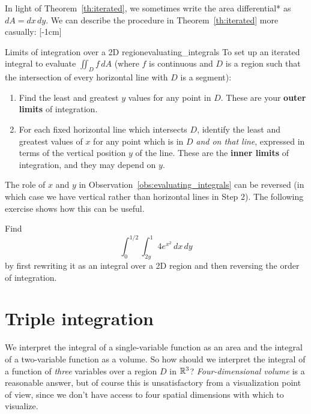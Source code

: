 \documentclass[svgnames]{report}
\begin{document}
In light of
Theorem~\ref{th:iterated}, we sometimes write the area differential*
as $dA = dx \, dy$. We can describe the procedure in
Theorem~\ref{th:iterated} more casually: [-1cm]
\begin{obs}{Limits of integration over a 2D
    region}{evaluating_integrals}
      To set up an iterated integral to evaluate $\iint_D f \, dA$ (where $f$ is continuous and $D$ is a
    region such that the intersection of every horizontal line with
    $D$ is a segment): 
  \begin{enumerate}
\item Find the least and greatest $y$ values for any point in
  $D$. These are your \textbf{outer limits} of integration. 
\item For each fixed horizontal line which intersects $D$, identify
  the least and greatest values of $x$ for any point which is in $D$
  \textit{and on that line}, expressed in terms of the vertical
  position $y$ of the line. These are the \textbf{inner limits} of
  integration, and they may depend on $y$.
\end{enumerate}
\end{obs}

The role of $x$ and $y$ in Observation~\ref{obs:evaluating_integrals} can
be reversed (in which case we have vertical rather than horizontal
lines in Step 2). The following exercise shows how this can be useful. 

\begin{exercise}{}{}
  Find
  \[
    \int_0^{1/2} \int_{2y}^1 4e^{x^2}\, dx\, dy
  \]
  by first rewriting it as an integral over a 2D
  region and then reversing the order of integration.
\end{exercise}


\section{Triple integration}


We interpret the integral of a single-variable function as an area and
the integral of a two-variable function as a volume. So how should we
interpret the integral of a function of \textit{three} variables over
a region $D$ in $\mathbb{R}^3$?  \textit{Four-dimensional volume} is a reasonable
answer, but of course this is unsatisfactory from a visualization
point of view, since we don't have access to four spatial dimensions
with which to visualize.
\end{document}
